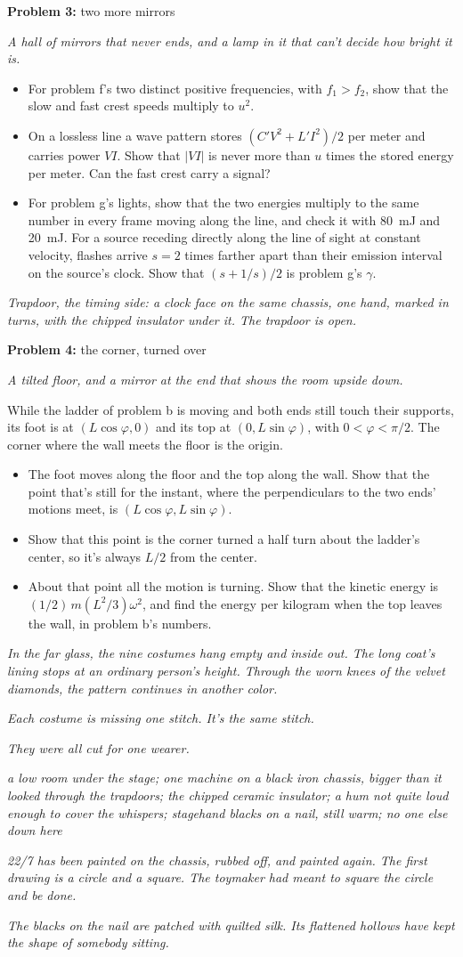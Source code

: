 \documentclass[11pt]{article}
\newcommand{\scene}[1]{\par{\itshape #1}\par}
\newcommand{\problem}[2]{\par\medskip\textbf{Problem #1:} #2\par\nopagebreak}
\newcommand{\appx}[2]{\clearpage{\Large\bfseries Appendix #1: #2}\par\medskip}
\newenvironment{parts}{\begin{itemize}[leftmargin=3.4em,labelwidth=2.8em,labelsep=0.6em,align=left,itemsep=3pt,topsep=4pt]}{\end{itemize}}
\newcommand{\pt}[1]{\item[\textbf{#1}]}
\begin{document}
\clearpage
\problem{3}{two more mirrors}
\scene{A hall of mirrors that never ends, and a lamp in it that can't decide how bright it is.}
\begin{parts}
\pt{3-$\alpha$} For problem f's two distinct positive frequencies, with $f_1 > f_2$, show that the slow and fast crest speeds multiply to $u^2$.
\pt{3-$\beta$} On a lossless line a wave pattern stores $(C'V^2 + L'I^2)/2$ per meter and carries power $VI$. Show that $|VI|$ is never more than $u$ times the stored energy per meter. Can the fast crest carry a signal?
\pt{3-$\gamma$} For problem g's lights, show that the two energies multiply to the same number in every frame moving along the line, and check it with \SI{80}{mJ} and \SI{20}{mJ}. For a source receding directly along the line of sight at constant velocity, flashes arrive $s = 2$ times farther apart than their emission interval on the source's clock. Show that $(s + 1/s)/2$ is problem g's $\gamma$.
\end{parts}
\scene{Trapdoor, the timing side: a clock face on the same chassis, one hand, marked in turns, with the chipped insulator under it. The trapdoor is open.}

\problem{4}{the corner, turned over}
\scene{A tilted floor, and a mirror at the end that shows the room upside down.}
While the ladder of problem b is moving and both ends still touch their supports, its foot is at $(L\cos\varphi, 0)$ and its top at $(0, L\sin\varphi)$, with $0 < \varphi < \pi/2$. The corner where the wall meets the floor is the origin.
\begin{parts}
\pt{4-$\alpha$} The foot moves along the floor and the top along the wall. Show that the point that's still for the instant, where the perpendiculars to the two ends' motions meet, is $(L\cos\varphi, L\sin\varphi)$.
\pt{4-$\beta$} Show that this point is the corner turned a half turn about the ladder's center, so it's always $L/2$ from the center.
\pt{4-$\gamma$} About that point all the motion is turning. Show that the kinetic energy is $(1/2)\,m(L^2/3)\omega^2$, and find the energy per kilogram when the top leaves the wall, in problem b's numbers.
\end{parts}
\scene{In the far glass, the nine costumes hang empty and inside out. The long coat's lining stops at an ordinary person's height. Through the worn knees of the velvet diamonds, the pattern continues in another color.}
\scene{Each costume is missing one stitch. It's the same stitch.}
\scene{They were all cut for one wearer.}

\appx{$\gamma$}{under the stage}
\scene{a low room under the stage; one machine on a black iron chassis, bigger than it looked through the trapdoors; the chipped ceramic insulator; a hum not quite loud enough to cover the whispers; stagehand blacks on a nail, still warm; no one else down here}
\scene{22/7 has been painted on the chassis, rubbed off, and painted again. The first drawing is a circle and a square. The toymaker had meant to square the circle and be done.}
\scene{The blacks on the nail are patched with quilted silk. Its flattened hollows have kept the shape of somebody sitting.}
\end{document}
